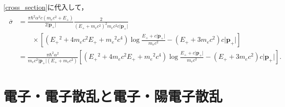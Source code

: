 \eqref{cross_section}に代入して，
\begin{align}
  \begin{split}
    \overline{\sigma} &= \frac{\pi\hbar^2\alpha^2c(m_ec^2 + E_+)}{2\lvert\boldsymbol{p}_+\rvert}\frac{2}{(E_+ + m_ec^2)^2m_ec^2c\lvert\boldsymbol{p}_+\rvert} \\
    & \qquad \times \left[(E_+{}^2 + 4m_ec^2E_+ + m_e{}^2c^4)\log \frac{E_+ + c\lvert\boldsymbol{p}_+\rvert}{m_ec^2} - (E_+ + 3m_ec^2) c\lvert\boldsymbol{p}_+\rvert\right] \\
    &= \frac{\pi\hbar^2\alpha^2}{m_ec^2\lvert\boldsymbol{p}_+\rvert(E_+ + m_ec^2)}\left[(E_+{}^2 + 4m_ec^2E_+ + m_e{}^2c^4)\log \frac{E_+ + c\lvert\boldsymbol{p}_+\rvert}{m_ec^2} - (E_+ + 3m_ec^2) c\lvert\boldsymbol{p}_+\rvert\right].
  \end{split}
\end{align}

\chapter{電子・電子散乱と電子・陽電子散乱}

